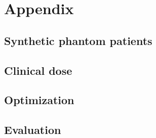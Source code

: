 \section*{Appendix}

\subsection*{Synthetic phantom patients}

\subsection*{Clinical dose}

\subsection*{Optimization}

\subsection*{Evaluation}
